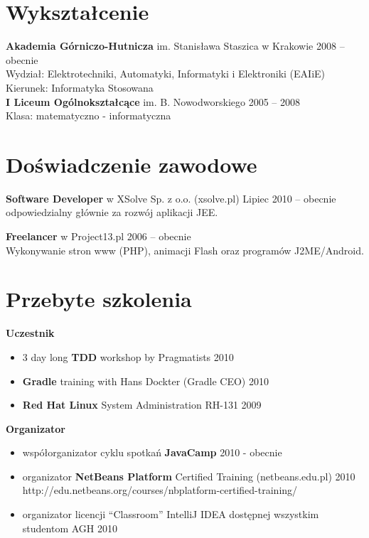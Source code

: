 \documentclass{res}
\begin{document}
\begin{resume} 
 

\section{Wykształcenie} 
{\bf Akademia Górniczo-Hutnicza} im. Stanisława Staszica w Krakowie \hfill 2008 – obecnie\\
	Wydział: Elektrotechniki, Automatyki, Informatyki i Elektroniki (EAIiE) \\
	Kierunek: Informatyka Stosowana\\ 

{\bf I Liceum Ogólnokształcące} im. B. Nowodworskiego \hfill 2005 – 2008\\
	Klasa: matematyczno - informatyczna\\ 

 

\section{Doświadczenie zawodowe}
{\bf Software Developer} w XSolve Sp. z o.o. (xsolve.pl) \hfill Lipiec 2010 – obecnie\\
	odpowiedzialny głównie za rozwój aplikacji JEE.

{\bf Freelancer} w Project13.pl \hfill 2006 – obecnie\\
	Wykonywanie stron www (PHP), animacji Flash oraz programów J2ME/Android.

\section{Przebyte szkolenia} 
{\bf Uczestnik}
\begin{itemize}
 \item 3 day long \textbf{TDD} workshop by Pragmatists \hfill 2010
 \item \textbf{Gradle} training with Hans Dockter (Gradle CEO) \hfill 2010
 \item \textbf{Red Hat Linux} System Administration RH-131 \hfill 2009
\end{itemize}
{\bf Organizator}
\begin{itemize}
 \item współorganizator cyklu spotkań \textbf{JavaCamp} \hfill 2010 - obecnie
 \item organizator \textbf{NetBeans Platform} Certified Training (netbeans.edu.pl) \hfill 2010 \\
	http://edu.netbeans.org/courses/nbplatform-certified-training/ 
 \item organizator licencji “Classroom” IntelliJ IDEA dostępnej wszystkim studentom AGH \hfill 2010
\end{itemize}


\end{resume}
\end{document}
